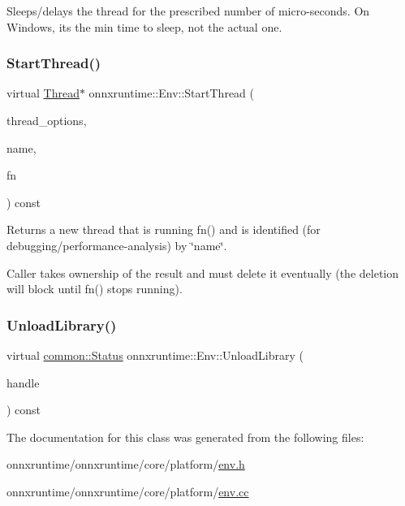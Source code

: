 Sleeps/delays the thread for the prescribed number of micro-\/seconds. On Windows, it\textquotesingle{}s the min time to sleep, not the actual one. \mbox{\label{classonnxruntime_1_1Env_a3c31e79c5ef19deafbaa10142aa4610e}} 
\subsubsection{\texorpdfstring{Start\+Thread()}{StartThread()}}
{\footnotesize\ttfamily virtual \mbox{\hyperlink{classonnxruntime_1_1Thread}{Thread}}$\ast$ onnxruntime\+::\+Env\+::\+Start\+Thread (\begin{DoxyParamCaption}\item[{const \mbox{\hyperlink{structonnxruntime_1_1ThreadOptions}{Thread\+Options}} \&}]{thread\+\_\+options,  }\item[{const std\+::string \&}]{name,  }\item[{std\+::function$<$ \mbox{\hyperlink{mlasi_8h_a88f941d423cb2a819b70a1358982b1a6}{void}}()$>$}]{fn }\end{DoxyParamCaption}) const\hspace{0.3cm}{\ttfamily [pure virtual]}}



Returns a new thread that is running fn() and is identified (for debugging/performance-\/analysis) by \char`\"{}name\char`\"{}. 

Caller takes ownership of the result and must delete it eventually (the deletion will block until fn() stops running). \mbox{\label{classonnxruntime_1_1Env_aeabb04baa50100699264a4ecac08abce}} 
\subsubsection{\texorpdfstring{Unload\+Library()}{UnloadLibrary()}}
{\footnotesize\ttfamily virtual \mbox{\hyperlink{classonnxruntime_1_1common_1_1Status}{common\+::\+Status}} onnxruntime\+::\+Env\+::\+Unload\+Library (\begin{DoxyParamCaption}\item[{\mbox{\hyperlink{mlasi_8h_a88f941d423cb2a819b70a1358982b1a6}{void}} $\ast$}]{handle }\end{DoxyParamCaption}) const\hspace{0.3cm}{\ttfamily [pure virtual]}}



The documentation for this class was generated from the following files\+:\begin{DoxyCompactItemize}
\item 
onnxruntime/onnxruntime/core/platform/\mbox{\hyperlink{env_8h}{env.\+h}}\item 
onnxruntime/onnxruntime/core/platform/\mbox{\hyperlink{env_8cc}{env.\+cc}}\end{DoxyCompactItemize}
